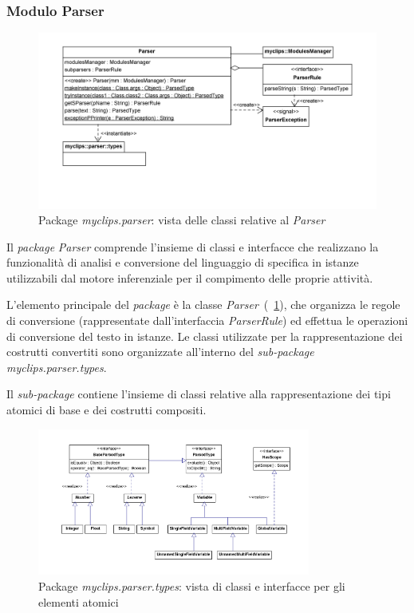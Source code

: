 
\subsubsection{Modulo Parser}

\begin{figure}[h]
\centering
\includegraphics[width=1\textwidth]{Immagini/Capitolo3/Classi/myclips_parser_Parser.png}
\caption{Package \emph{myclips.parser}: vista delle classi relative al \emph{Parser}}\label{fig:class-myclips-parser-Parser}
\end{figure}

Il \emph{package} \emph{Parser} comprende l'insieme di classi e interfacce che realizzano la funzionalità di analisi e conversione del linguaggio di specifica in istanze utilizzabili dal motore inferenziale per il compimento delle proprie attività.

L'elemento principale del \emph{package} è la classe \emph{Parser}~(\figurename~\ref{fig:class-myclips-parser-Parser}), che organizza le regole di conversione (rappresentate dall'interfaccia \emph{ParserRule}) ed effettua le operazioni di conversione del testo in istanze. Le classi utilizzate per la rappresentazione dei costrutti convertiti sono organizzate all'interno del \emph{sub-package} \emph{myclips.parser.types}.

Il \emph{sub-package} contiene l'insieme di classi relative alla rappresentazione dei tipi atomici di base e dei costrutti compositi.

\begin{figure}[h]
\centering
\includegraphics[width=0.8\textwidth]{Immagini/Capitolo3/Classi/myclips_parser_types_Atoms.png}
\caption{Package \emph{myclips.parser.types}: vista di classi e interfacce per gli elementi atomici}\label{fig:class-myclips-parser-types-Atoms}
\end{figure}

